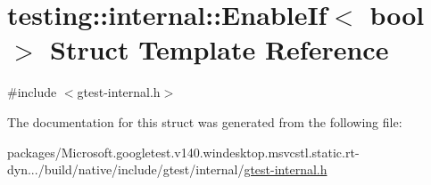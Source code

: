 \hypertarget{structtesting_1_1internal_1_1_enable_if}{}\section{testing\+::internal\+::Enable\+If$<$ bool $>$ Struct Template Reference}
\label{structtesting_1_1internal_1_1_enable_if}


{\ttfamily \#include $<$gtest-\/internal.\+h$>$}



The documentation for this struct was generated from the following file\+:\begin{DoxyCompactItemize}
\item 
packages/\+Microsoft.\+googletest.\+v140.\+windesktop.\+msvcstl.\+static.\+rt-\/dyn.../build/native/include/gtest/internal/\mbox{\hyperlink{gtest-internal_8h}{gtest-\/internal.\+h}}\end{DoxyCompactItemize}
